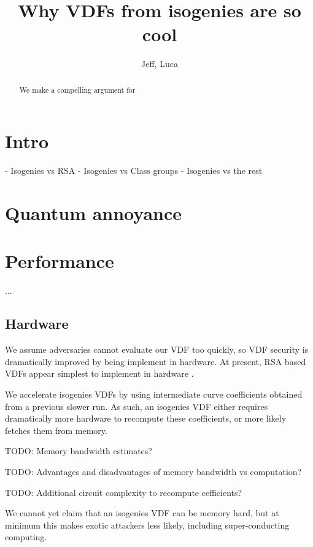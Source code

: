 \documentclass{article}
\title{Why VDFs from isogenies are so cool}
\author{Jeff, Luca}
\date{}
\begin{document}
\maketitle

\begin{abstract}
We make a compelling argument for 
\end{abstract}

\section{Intro}


- Isogenies vs RSA
- Isogenies vs Class groups
- Isogenies vs the rest


\section{Quantum annoyance}



\section{Performance}

...

\subsection{Hardware}

We assume adversaries cannot evaluate our VDF too quickly, so
VDF security is dramatically improved by being implement in hardware.
At present, RSA based VDFs appear simplest to implement in hardware 
\cite{???}.  %

We accelerate isogenies VDFs by using intermediate curve coefficients
obtained from a previous slower run.  As such, an isogenies VDF either
requires dramatically more hardware to recompute these coefficients,
or more likely fetches them from memory.  

TODO:  Memory bandwidth estimates?

TODO:  Advantages and disadvantages of memory bandwidth vs computation? 

TODO:  Additional circuit complexity to recompute cefficients?

We cannot yet claim that an isogenies VDF can be memory hard,
but at minimum this makes exotic attackers less likely, including
super-conducting computing.
\end{document}
